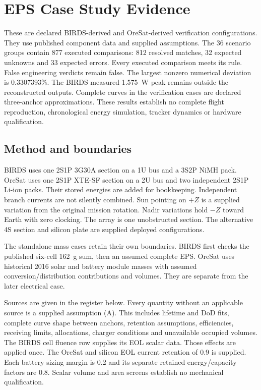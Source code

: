 \chapter{EPS Case Study Evidence}
\label{appendix:eps-case-studies}
These are declared BIRDS-derived and OreSat-derived verification configurations.
They use published component data and supplied assumptions.
The 36 scenario groups contain 877 executed comparisons: 812 resolved matches,
32 expected unknowns and 33 expected errors.
Every executed comparison meets its rule. False engineering verdicts remain false.
The largest nonzero numerical deviation is 0.3307393\%.
The BIRDS measured 1.575~W peak remains outside the reconstructed outputs.
Complete curves in the verification cases are declared three-anchor approximations.
These results establish no complete flight reproduction, chronological energy
simulation, tracker dynamics or hardware qualification.

\section{Method and boundaries}
BIRDS uses one 2S1P 3G30A section on a 1U bus and a 3S2P NiMH pack.
OreSat uses one 2S1P XTE-SF section on a 2U bus and two independent 2S1P
Li-ion packs. Their stored energies are added for bookkeeping.
Independent branch currents are not silently combined.
Sun pointing on $+Z$ is a supplied variation from the original mission rotation.
Nadir variations hold $-Z$ toward Earth with zero clocking.
The array is one unobstructed section.
The alternative 4S section and silicon plate are supplied deployed configurations.

The standalone mass cases retain their own boundaries.
BIRDS first checks the published six-cell 162~g sum, then an assumed complete EPS.
OreSat uses historical 2016 solar and battery module masses with assumed
conversion/distribution contributions and volumes.
They are separate from the later electrical case.

Sources are given in the register below.
Every quantity without an applicable source is a supplied assumption (A).
This includes lifetime and DoD fits, complete curve shape between anchors,
retention assumptions, efficiencies, receiving limits, allocations, charger
conditions and unavailable occupied volumes.
The BIRDS cell fluence row supplies its EOL scalar data.
Those effects are applied once.
The OreSat and silicon EOL current retention of 0.9 is supplied.
Each battery sizing margin is 0.2 and its separate retained energy/capacity
factors are 0.8.
Scalar volume and area screens establish no mechanical qualification.

